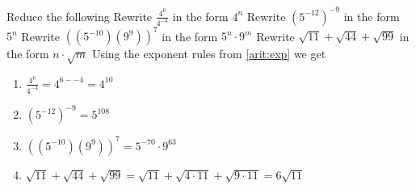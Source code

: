 \begin{ExerciseList}
\Exercise Reduce the following
\Question Rewrite $\frac{4^6}{4^{-4}}$ in the form $4^n$
\Question Rewrite $(5^{-12})^{-9}$ in the form $5^n$
\Question Rewrite $((5^{-10})(9^9))^7$ in the form $5^n \cdot 9^m$
\Question Rewrite $\sqrt{11} + \sqrt{44} + \sqrt{99}$ in the form $n \cdot \sqrt{m}$
\Answer Using the exponent rules from \ref{arit:exp} we get
\begin{enumerate}
\item\myindent $\frac{4^6}{4^{-4}} = 4^{6 - -4} = 4^{10}$
\item\myindent $(5^{-12})^{-9} = 5^{108}$
\item\myindent $((5^{-10})(9^9))^7 = 5^{-70} \cdot 9^{63}$
\item\myindent $\sqrt{11} + \sqrt{44} + \sqrt{99} =
                \sqrt{11} + \sqrt{4 \cdot 11} + \sqrt{9 \cdot 11} = 6\sqrt{11}$
\end{enumerate}
\end{ExerciseList}
